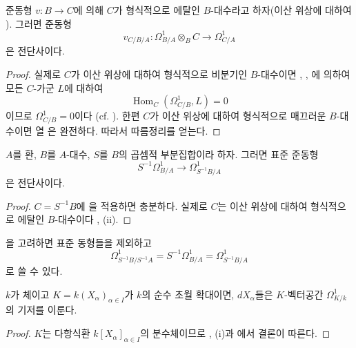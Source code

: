 \begin{corollary}[20.5.8]
\label{0.20.5.8-ko}
준동형 $v:B\to C$에 의해 $C$가 형식적으로 에탈인 $B$-대수라고
하자(이산 위상에 대하여 ). 그러면 준동형
\[
  v_{C/B/A}:\Omega^1_{B/A}\otimes_B C\to\Omega^1_{C/A}
\]
은 전단사이다.
\end{corollary}

\begin{proof}
실제로 $C$가 이산 위상에 대하여 형식적으로 비분기인
$B$-대수이면 , ,
에 의하여 모든 $C$-가군 $L$에 대하여
\[
  \operatorname{Hom}_C(\Omega^1_{C/B},L)=0
\]
이므로 $\Omega^1_{C/B}=0$이다
(cf. ). 한편 $C$가 이산 위상에 대하여
형식적으로 매끄러운 $B$-대수이면 열
은 완전하다. 따라서 따름정리를 얻는다.
\end{proof}

\begin{corollary}[20.5.9]
\label{0.20.5.9-ko}
$A$를 환, $B$를 $A$-대수, $S$를 $B$의 곱셈적 부분집합이라
하자. 그러면 표준 준동형
\begin{equation}
\tag{20.5.9.1}
\label{0.20.5.9.1-ko}
  S^{-1}\Omega^1_{B/A}\to\Omega^1_{S^{-1}B/A}
\end{equation}
은 전단사이다.
\end{corollary}

\begin{proof}
$C=S^{-1}B$에 을 적용하면 충분하다. 실제로
$C$는 이산 위상에 대하여 형식적으로 에탈인 $B$-대수이다
, (ii).
\end{proof}

을 고려하면 표준 동형들을 제외하고
\begin{equation}
\tag{20.5.9.2}
\label{0.20.5.9.2-ko}
  \Omega^1_{S^{-1}B/S^{-1}A}
  =S^{-1}\Omega^1_{B/A}
  =\Omega^1_{S^{-1}B/A}
\end{equation}
로 쓸 수 있다.

\begin{corollary}[20.5.10]
\label{0.20.5.10-ko}
$k$가 체이고 $K=k(X_\alpha)_{\alpha\in I}$가 $k$의 순수 초월
확대이면, $dX_\alpha$들은 $K$-벡터공간
$\Omega^1_{K/k}$의 기저를 이룬다.
\end{corollary}

\begin{proof}
$K$는 다항식환 $k[X_\alpha]_{\alpha\in I}$의 분수체이므로
, (i)과 에서 결론이 따른다.
\end{proof}

